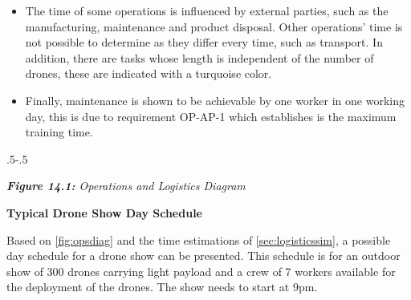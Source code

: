\begin{itemize} [noitemsep,nolistsep]
    \item  The time of some operations is influenced by external parties, such as the manufacturing, maintenance and product disposal. Other operations' time is not possible to determine as they differ every time, such as transport. In addition, there are tasks whose length is independent of the number of drones, these are indicated with a turquoise color. 
    
    \item Finally, maintenance is shown to be achievable by one worker in one working day, this is due to requirement OP-AP-1 which establishes is the maximum training time.

\end{itemize}

\clearpage
\newpage
{\pdfpagewidth
    \vspace*{0cm}
    \hspace{5.5cm}
    \noindent\kern.5\pdfpagewidth{}\kern-.5\pdfpagewidth
     \par
     \textit{\Large{\textbf{Figure 14.1:} Operations and Logistics Diagram}} \label{fig:opsdiag}
     \vspace*{-5cm}
\clearpage

}

\textbf{Typical Drone Show Day Schedule}

Based on \autoref{fig:opsdiag} and the time estimations of \autoref{sec:logisticssim}, a possible day schedule for a drone show can be presented. This schedule is for an outdoor show of 300 drones carrying light payload and a crew of 7 workers available for the deployment of the drones. The show needs to start at 9pm. 

